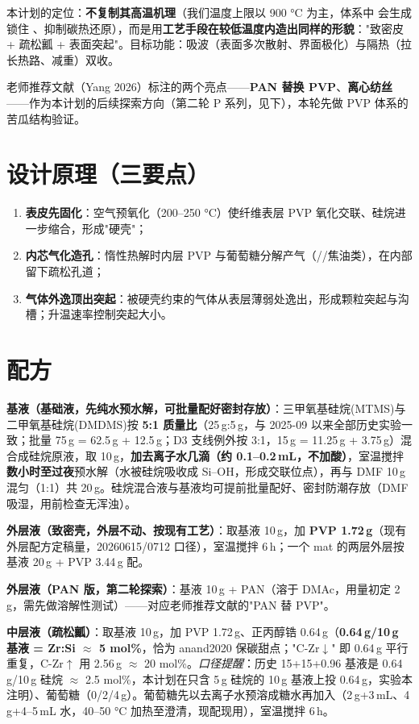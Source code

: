 本计划的定位：\textbf{不复制其高温机理}（我们温度上限以 900 °C 为主，体系中  会生成  锁住 、抑制碳热还原），而是用\textbf{工艺手段在较低温度内造出同样的形貌}："致密皮 + 疏松瓤 + 表面突起"。目标功能：吸波（表面多次散射、界面极化）与隔热（拉长热路、减重）双收。

老师推荐文献（Yang 2026）标注的两个亮点——\textbf{PAN 替换 PVP}、\textbf{离心纺丝}——作为本计划的后续探索方向（第二轮 P 系列，见下），本轮先做 PVP 体系的苦瓜结构验证。

\section{设计原理（三要点）}

\begin{enumerate}
  \item \textbf{表皮先固化}：空气预氧化（200–250 °C）使纤维表层 PVP 氧化交联、硅烷进一步缩合，形成"硬壳"；
  \item \textbf{内芯气化造孔}：惰性热解时内层 PVP 与葡萄糖分解产气（//焦油类），在内部留下疏松孔道；
  \item \textbf{气体外逸顶出突起}：被硬壳约束的气体从表层薄弱处逸出，形成颗粒突起与沟槽；升温速率控制突起大小。
\end{enumerate}

\section{配方}

\textbf{基液（基础液，先纯水预水解，可批量配好密封存放）}：三甲氧基硅烷(MTMS)与二甲氧基硅烷(DMDMS)按 \textbf{5:1 质量比}（25\,g:5\,g，与 2025-09 以来全部历史实验一致；批量 75\,g = 62.5\,g + 12.5\,g；D3 支线例外按 3:1，15\,g = 11.25\,g + 3.75\,g）混合成硅烷原液，取 10\,g，\textbf{加去离子水几滴（约 0.1--0.2\,mL，不加酸）}，室温搅拌\textbf{数小时至过夜}预水解（水被硅烷吸收成 Si--OH，形成交联位点），再与 DMF 10\,g 混匀（1:1）共 20\,g。硅烷混合液与基液均可提前批量配好、密封防潮存放（DMF 吸湿，用前检查无浑浊）。

\textbf{外层液（致密壳，外层不动、按现有工艺）}：取基液 10\,g，加 \textbf{PVP 1.72\,g}（现有外层配方定稿量，20260615/0712 口径），室温搅拌 6\,h；一个 mat 的两层外层按基液 20\,g + PVP 3.44\,g 配。

\textbf{外层液（PAN 版，第二轮探索）}：基液 10\,g + PAN（溶于 DMAc，用量初定 2\,g，需先做溶解性测试）——对应老师推荐文献的"PAN 替 PVP"。

\textbf{中层液（疏松瓤）}：取基液 10\,g，加 PVP 1.72\,g、正丙醇锆 0.64\,g（\textbf{0.64\,g/10\,g 基液 = Zr:Si $\approx$ 5 mol\%}，恰为 anand2020 保碳甜点；"C-Zr$\downarrow$" 即 0.64\,g 平行重复，C-Zr$\uparrow$ 用 2.56\,g $\approx$ 20 mol\%。\emph{口径提醒}：历史 15+15+0.96 基液是 0.64\,g/10\,g 硅烷 $\approx$ 2.5 mol\%，本计划在只含 5\,g 硅烷的 10\,g 基液上投 0.64\,g，实验本注明）、葡萄糖（0/2/4\,g）。葡萄糖先以去离子水预溶成糖水再加入（2\,g+3\,mL、4\,g+4--5\,mL 水，40--50 °C 加热至澄清，现配现用），室温搅拌 6\,h。

